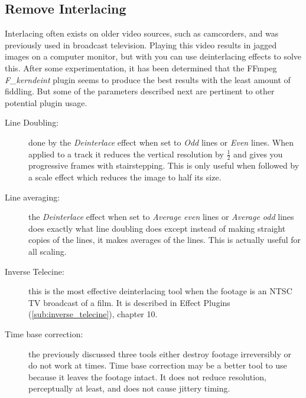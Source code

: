 \subsection{Remove Interlacing}%
\label{sub:remove_interlacing}

Interlacing often exists on older video sources, such as camcorders, and was previously used in broadcast television. Playing this video results in jagged images on a computer monitor, but with \CGG{} you can use deinterlacing effects to solve this.  After some experimentation, it has been determined that the FFmpeg \textit{F\_kerndeint} plugin seems to produce the best results with the least amount of fiddling.  But some of the parameters described next are pertinent to other potential plugin usage.

\begin{description}
	\item[Line Doubling:] done by the \textit{Deinterlace} effect when set to \textit{Odd} lines or \textit{Even} lines.  When applied to a track it reduces the vertical resolution by $\frac{1}{2}$ and gives you progressive frames with stairstepping. This is only useful when followed by a scale effect which reduces the image to half its size.
	\item[Line averaging:] the \textit{Deinterlace} effect when set to \textit{Average even} lines or \textit{Average odd} lines does exactly what line doubling does except instead of making straight copies of the lines, it makes averages of the lines. This is actually useful for all scaling.
	\item[Inverse Telecine:] this is the most effective deinterlacing tool when the footage is an NTSC TV broadcast of a film. It is described in Effect Plugins (\ref{sub:inverse_telecine}), chapter 10.
	\item[Time base correction:] the previously discussed three tools either destroy footage irreversibly or do not work at times. Time base correction may be a better tool to use because it leaves the footage intact. It does not reduce resolution, perceptually at least, and does not cause jittery timing.

\end{description}
